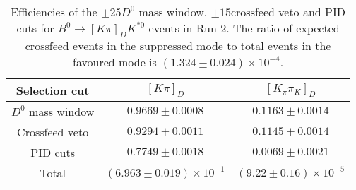 \begin{table}
    \centering
    \begin{tabular}{ccc}
        \toprule
Selection cut & $[K \pi]_D$ & $[K_\pi \pi_K]_D$ \\
        \midrule
$D^0$ mass window & $0.9669 \pm 0.0008$ & $0.1163 \pm 0.0014$ \\
Crossfeed veto & $0.9294 \pm 0.0011$ & $0.1145 \pm 0.0014$ \\
PID cuts & $0.7749 \pm 0.0018$ & $0.0069 \pm 0.0021$\\
        \midrule
Total & $(6.963 \pm 0.019) \times 10^{-1}$ & $(9.22 \pm 0.16) \times 10^{-5}$\\
        \bottomrule
    \end{tabular}
    \caption{Efficiencies of the $\pm 25$\mev $D^0$ mass window, $\pm 15$\mev crossfeed veto and PID cuts for $B^0 \to [K\pi]_D K^{*0}$ events in Run 2. The ratio of expected crossfeed events in the suppressed mode to total events in the favoured mode is $(1.324 \pm 0.024) \times 10^{-4}$.}
\label{tab:double_misID_eff_Kpi_run2}
\end{table}
